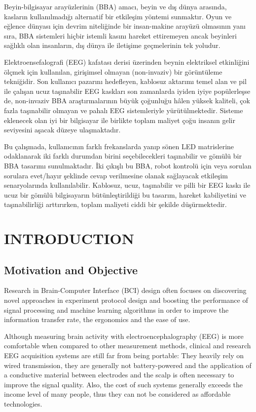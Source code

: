 \documentclass[12pt]{article}
\newcommand\mysection[1]{\vspace*{-0.35cm}\section{#1}\vspace*{6pt}\thispagestyle{empty}}
\newcommand\mysubsection[1]{\subsection{#1}}
\numberwithin{equation}{section}
\numberwithin{figure}{section}
\numberwithin{table}{section}
\begin{document}
\par{
    Beyin-bilgisayar arayüzlerinin (BBA) amacı, beyin ve dış dünya arasında, kasların
    kullanılmadığı alternatif bir etkileşim yöntemi sunmaktır. Oyun ve eğlence dünyası için devrim niteliğinde
    bir insan-makine arayüzü olmasının yanı sıra, BBA sistemleri hiçbir istemli kasını
    hareket ettiremeyen ancak beyinleri sağlıklı olan insanların, dış dünya ile iletişime geçmelerinin
    tek yoludur.
}
\par{
    Elektroensefalografi (EEG) kafatası derisi üzerinden beynin elektriksel
    etkinliğini ölçmek için kullanılan, girişimsel olmayan (non-invaziv) bir
    görüntüleme tekniğidir. Son kullanıcı pazarını hedefleyen,
    kablosuz aktarımı temel alan ve pil ile çalışan ucuz taşınabilir EEG kaskları son
    zamanlarda iyiden iyiye popülerleşse de, non-invaziv BBA araştırmalarının
    büyük çoğunluğu hâlen yüksek kaliteli, çok fazla taşınabilir olmayan
    ve pahalı EEG sistemleriyle yürütülmektedir. Sisteme eklenecek olan
    iyi bir bilgisayar ile birlikte toplam maliyet çoğu insanın gelir seviyesini
    aşacak düzeye ulaşmaktadır.
}
\par{
    Bu çalışmada, kullanıcının farklı frekanslarda yanıp sönen LED matrislerine
    odaklanarak iki farklı durumdan birini seçebilecekleri taşınabilir ve gömülü
    bir BBA tasarımı sunulmaktadır. İki çıkışlı bu BBA, robot kontrolü için veya
    sorulan sorulara evet/hayır şeklinde cevap verilmesine olanak sağlayacak
    etkileşim senaryolarında kullanılabilir. Kablosuz, ucuz, taşınabilir ve pilli bir EEG
    kaskı ile ucuz bir gömülü bilgisayarın bütünleştirildiği bu tasarım,
    hareket kabiliyetini ve taşınabilirliği arttırırken, toplam maliyeti
    ciddi bir şekilde düşürmektedir.
}
\clearpage

\mysection{INTRODUCTION}
\thispagestyle{fancy}
\cfoot{}

\mysubsection{Motivation and Objective}
\par{
    Research in Brain-Computer Interface (BCI) design often focuses
    on discovering novel approaches in experiment protocol design and
    boosting the performance of signal processing and machine learning algorithms
    in order to improve the information transfer rate, the ergonomics and the
    ease of use.
}

\par{
    Although measuring brain activity with electroencephalography (EEG) is more
    comfortable when compared to other measurement methods, clinical and research
    EEG acquisition systems are still far from being portable: They heavily
    rely on wired transmission, they are generally not battery-powered and
    the application of a conductive material between electrodes and the scalp is
    often necessary to improve the signal quality. Also, the cost of such systems
    generally exceeds the income level of many people, thus they can not be
    considered as affordable technologies.
}
\end{document}
